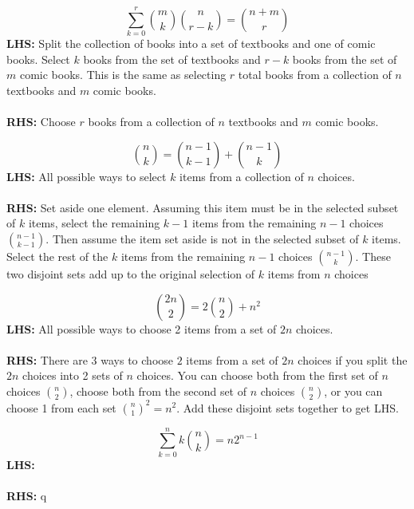 \documentclass{article}\usepackage{amsmath,amssymb,amsthm,tikz,tkz-graph,color,chngpage,soul,hyperref,csquotes,graphicx,floatrow, listings}\newcommand*{\QEDB}{\hfill\ensuremath{\square}}\newtheorem*{prop}{Proposition}\renewcommand{\theenumi}{\alph{enumi}}\usepackage[shortlabels]{enumitem}\usepackage[nobreak=true]{mdframed}\usetikzlibrary{matrix,calc}\MakeOuterQuote{"}\usepackage[margin=0.75in]{geometry} \newtheorem{theorem}{Theorem}\newcommand{\Z}{\mathbb Z}\newcommand{\R}{\mathbb R}\newcommand{\Q}{\mathbb Q}\newcommand{\N}{\mathbb N}\newcommand{\x}[1]{\textrm{ #1 }}\newcommand{\pr}{\textrm{Pr}}
\newcommand{\sumlim}[3]{\sum\limits_{#1}^{#2}#3}
\newcommand{\eq}[1]{\begin{equation}#1\end{equation}}
\begin{document}
\begin{mdframed}
\eq{\sumlim{k=0}{r}{\binom{m}{k}\binom{n}{r-k}}=\binom{n+m}{r}}
\textbf{LHS:} Split the collection of books into a set of textbooks and one of comic books. Select $k$ books from the set of textbooks and $r-k$ books from the set of $m$ comic books. This is the same as selecting $r$ total books from a collection of $n$ textbooks and $m$ comic books.\\\\
\textbf{RHS:} Choose $r$ books from a collection of $n$ textbooks and $m$ comic books.
\end{mdframed}
\begin{mdframed}
\eq{\binom{n}{k}=\binom{n-1}{k-1}+\binom{n-1}{k}}
\textbf{LHS:} All possible ways to select $k$ items from a collection of $n$ choices.\\\\
\textbf{RHS:} Set aside one element. Assuming this item must be in the selected subset of $k$ items, select the remaining $k-1$ items from the remaining $n-1$ choices $\binom{n-1}{k-1}$. Then assume the item set aside is not in the selected subset of $k$ items. Select the rest of the $k$ items from the remaining $n-1$ choices $\binom{n-1}{k}$. These two disjoint sets add up to the original selection of $k$ items from $n$ choices
\end{mdframed}
\begin{mdframed}
\eq{\binom{2n}{2}=2\binom{n}{2}+n^2}
\textbf{LHS:} All possible ways to choose 2 items from a set of $2n$ choices.\\\\
\textbf{RHS:} There are 3 ways to choose $2$ items from a set of $2n$ choices if you split the $2n$ choices into 2 sets of $n$ choices. You can choose both from the first set of $n$ choices $\binom{n}{2}$, choose both from the second set of $n$ choices $\binom{n}{2}$, or you can choose 1 from each set $\binom{n}{1}^2=n^2$. Add these disjoint sets together to get LHS.
\end{mdframed}
\begin{mdframed}
\eq{\sumlim{k=0}{n}k\binom{n}{k}=n2^{n-1}}
\textbf{LHS:} \\\\
\textbf{RHS:} q\
\end{mdframed}
\end{document}
